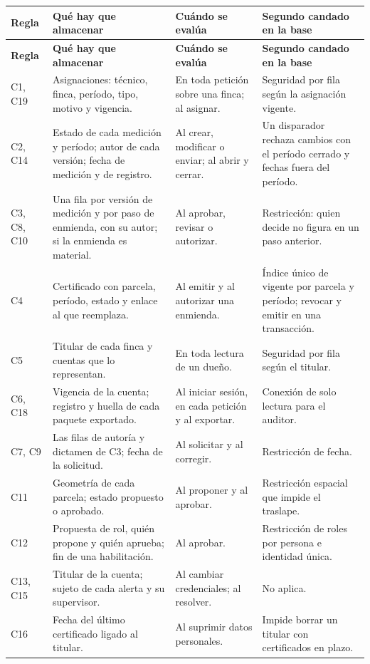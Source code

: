 \documentclass[11pt,letterpaper]{article}
\newcommand{\cab}[1]{\textbf{\rmfamily #1}}
\begin{document}
{\small
\renewcommand{\arraystretch}{1.13}
\begin{longtable}{@{}L{1.9cm} L{5.4cm} L{3.6cm} L{4.6cm}@{}}
\toprule
\cab{Regla} & \cab{Qué hay que almacenar} & \cab{Cuándo se evalúa} & \cab{Segundo candado en la base} \\
\midrule
\endfirsthead
\toprule
\cab{Regla} & \cab{Qué hay que almacenar} & \cab{Cuándo se evalúa} & \cab{Segundo candado en la base} \\
\midrule
\endhead
\bottomrule
\endfoot
C1, C19 & Asignaciones: técnico, finca, período, tipo, motivo y vigencia. & En toda petición sobre una finca; al asignar. & Seguridad por fila según la asignación vigente. \\
C2, C14 & Estado de cada medición y período; autor de cada versión; fecha de medición y de registro. & Al crear, modificar o enviar; al abrir y cerrar. & Un disparador rechaza cambios con el período cerrado y fechas fuera del período. \\
C3, C8, C10 & Una fila por versión de medición y por paso de enmienda, con su autor; si la enmienda es material. & Al aprobar, revisar o autorizar. & Restricción: quien decide no figura en un paso anterior. \\
C4 & Certificado con parcela, período, estado y enlace al que reemplaza. & Al emitir y al autorizar una enmienda. & Índice único de vigente por parcela y período; revocar y emitir en una transacción. \\
C5 & Titular de cada finca y cuentas que lo representan. & En toda lectura de un dueño. & Seguridad por fila según el titular. \\
C6, C18 & Vigencia de la cuenta; registro y huella de cada paquete exportado. & Al iniciar sesión, en cada petición y al exportar. & Conexión de solo lectura para el auditor. \\
C7, C9 & Las filas de autoría y dictamen de C3; fecha de la solicitud. & Al solicitar y al corregir. & Restricción de fecha. \\
C11 & Geometría de cada parcela; estado propuesto o aprobado. & Al proponer y al aprobar. & Restricción espacial que impide el traslape. \\
C12 & Propuesta de rol, quién propone y quién aprueba; fin de una habilitación. & Al aprobar. & Restricción de roles por persona e identidad única. \\
C13, C15 & Titular de la cuenta; sujeto de cada alerta y su supervisor. & Al cambiar credenciales; al resolver. & No aplica. \\
C16 & Fecha del último certificado ligado al titular. & Al suprimir datos personales. & Impide borrar un titular con certificados en plazo. \\

\end{longtable}}
\end{document}
